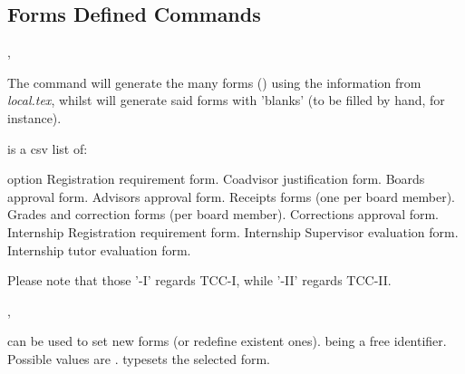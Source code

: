 \documentclass[article,nofontwarning,nogeometry,english,tocdepth=3,secdepth=3]{ufrgscca} %
\begin{document}
\subsection{Forms Defined Commands}\label{forms.commands}
\begin{codedescribe}[code,update=2023/05/29]{\tcforms,\tcemptyforms}
	\begin{codesyntax}%
\end{codesyntax}
The command \tsmacro{\tcforms}{} will generate the many forms () using the information from \emph{local.tex}, whilst \tsmacro{\tcemptyforms}{} will generate said forms with 'blanks' (to be filled by hand, for instance).

\end{codedescribe}

 is a csv list of:
\begin{describelist*}{option}
     {}
     { Registration requirement form.}
     {}
     { Coadvisor justification form.}
     {}
     { Boards approval form.}
     {}
     { Advisors approval form.}
     { Receipts forms (one per board member).}
     {}
     { Grades and correction forms (per board member).}
     {}
     { Corrections approval  form.}
     { Internship Registration requirement form.}
     { Internship Supervisor evaluation form.}
     { Internship tutor evaluation form.}
\end{describelist*}
Please note that those '-I' regards TCC-I, while '-II' regards TCC-II.

\begin{codedescribe}[code,new=2023/11/18]{\SetForm,\MakeForm}
	\begin{codesyntax}%
\end{codesyntax}
\tsobj{\SetForm} can be used to set new forms (or redefine existent ones).  being a free identifier. Possible  values are . \tsobj{\MakeForm} typesets the selected form.
\end{codedescribe}
\end{document}
